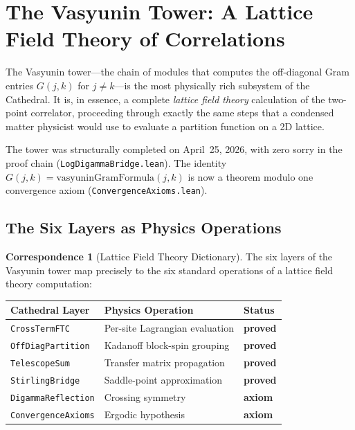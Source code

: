 \documentclass[11pt,a4paper]{article}
\theoremstyle{definition}
\newtheorem{correspondence}[definition]{Correspondence}
\newcommand{\lean}[1]{\texttt{#1}}
\begin{document}
\section{The Vasyunin Tower: A Lattice Field Theory of Correlations}
\label{sec:vasyunin}

The Vasyunin tower---the chain of modules that computes the off-diagonal
Gram entries $G(j,k)$ for $j \neq k$---is the most physically rich
subsystem of the Cathedral. It is, in essence, a complete
\emph{lattice field theory} calculation of the two-point correlator,
proceeding through exactly the same steps that a condensed matter
physicist would use to evaluate a partition function on a 2D lattice.

The tower was structurally completed on April~25, 2026, with zero sorry
in the proof chain (\lean{LogDigammaBridge.lean}). The identity
$G(j,k) = \text{vasyuninGramFormula}(j,k)$ is now a theorem modulo
one convergence axiom (\lean{ConvergenceAxioms.lean}).

\subsection{The Six Layers as Physics Operations}

\begin{correspondence}[Lattice Field Theory Dictionary]
\label{corr:lattice}
The six layers of the Vasyunin tower map precisely to the six
standard operations of a lattice field theory computation:

\begin{center}
\begin{tabular}{@{}lll@{}}
\toprule
\textbf{Cathedral Layer} & \textbf{Physics Operation} & \textbf{Status} \\
\midrule
\lean{CrossTermFTC} & Per-site Lagrangian evaluation & \textbf{proved} \\
\lean{OffDiagPartition} & Kadanoff block-spin grouping & \textbf{proved} \\
\lean{TelescopeSum} & Transfer matrix propagation & \textbf{proved} \\
\lean{StirlingBridge} & Saddle-point approximation & \textbf{proved} \\
\lean{DigammaReflection} & Crossing symmetry & \textbf{axiom} \\
\lean{ConvergenceAxioms} & Ergodic hypothesis & \textbf{axiom} \\
\bottomrule
\end{tabular}
\end{center}
\end{correspondence}
\end{document}
